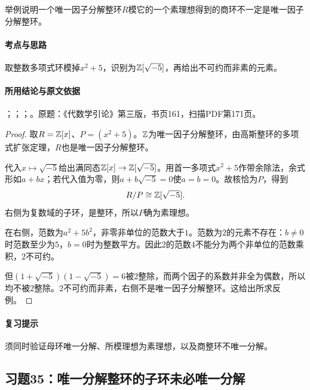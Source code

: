 举例说明一个唯一因子分解整环$R$模它的一个素理想得到的商环不一定是唯一因子分解整环。

\paragraph{考点与思路}

取整数多项式环模掉$x^2+5$，识别为$\mathbb Z[\sqrt{-5}]$，再给出不可约而非素的元素。

\paragraph{所用结论与原文依据}

；；；。原题：《代数学引论》第三版，书页161，扫描PDF第171页。


\begin{proof}

取$R=\mathbb Z[x]$、$P=(x^2+5)$。$\mathbb Z$为唯一因子分解整环，由高斯整环的多项式扩张定理，$R$也是唯一因子分解整环。

代入$x\mapsto\sqrt{-5}$给出满同态$\mathbb Z[x]\to\mathbb Z[\sqrt{-5}]$。用首一多项式$x^2+5$作带余除法，余式形如$a+bx$；若代入值为零，则$a+b\sqrt{-5}=0$使$a=b=0$。故核恰为$P$，得到
\[
R/P\cong\mathbb Z[\sqrt{-5}].
\]
右侧为复数域的子环，是整环，所以$P$确为素理想。

在右侧，范数为$a^2+5b^2$，非零非单位的范数大于$1$。范数为$2$的元素不存在：$b\ne0$时范数至少为$5$，$b=0$时为整数平方。因此$2$的范数$4$不能分为两个非单位的范数乘积，$2$不可约。

但$(1+\sqrt{-5})(1-\sqrt{-5})=6$被$2$整除，而两个因子的系数并非全为偶数，所以均不被$2$整除。$2$不可约而非素，右侧不是唯一因子分解整环。这给出所求反例。

\end{proof}

\paragraph{复习提示}

须同时验证母环唯一分解、所模理想为素理想，以及商整环不唯一分解。

\subsection{习题35：唯一分解整环的子环未必唯一分解}

\label{ex:4:35}

